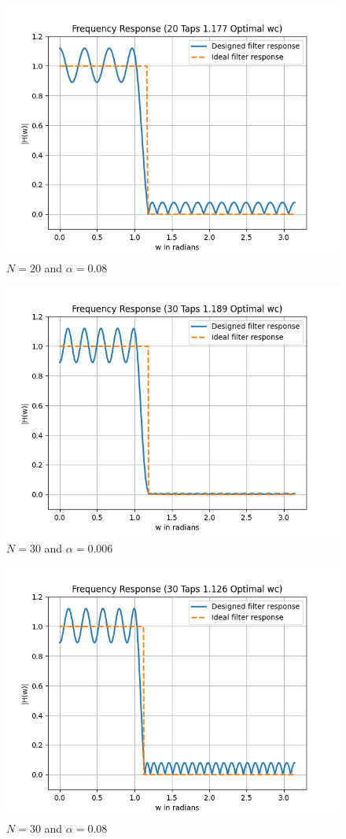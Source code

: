 \documentclass[conference]{IEEEtran}
\begin{document}
\begin{enumerate}[label=(\alph*)]
\begin{figure}[!h]
	\begin{center} 
	    \includegraphics[width=0.7\columnwidth]{figs/B/N20_a2}
	\end{center}
\caption{$N=20$ and $\alpha = 0.08$}
\label{fig:Fig7}
\end{figure}

\begin{figure}[!h]
	\begin{center} 
	    \includegraphics[width=0.7\columnwidth]{figs/B/N30_a1}
	\end{center}
\caption{$N=30$ and $\alpha = 0.006$}
\label{fig:Fig8}
\end{figure}

\begin{figure}[!h]
	\begin{center} 
	    \includegraphics[width=0.7\columnwidth]{figs/B/N30_a2}
	\end{center}
\caption{$N=30$ and $\alpha = 0.08$}
\label{fig:Fig9}
\end{figure}


\end{enumerate}
\end{document}
